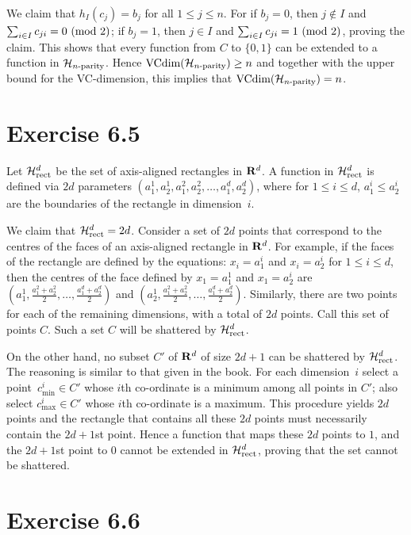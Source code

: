 We claim that $h_I(c_j) = b_j$ for all $1 \leq j \leq n$. For if $b_j = 0$, 
then $j \notin I$ and $\sum_{i \in I} c_{j i} = 0 \ (\mathrm{mod}\ 2)$; if $b_j = 1$,
then $j \in I$ and $\sum_{i \in I} c_{j i} = 1 \ (\mathrm{mod}\ 2)$, proving the claim. 
This shows that every function from $C$ to $\{0, 1\}$ can be extended to a function
in $\mathcal{H}_{n\text{-parity}}$. Hence $\text{VCdim} (\mathcal{H}_{n\text{-parity}}) \geq n$ and together with the upper 
bound for the VC-dimension, this implies that $\text{VCdim} (\mathcal{H}_{n\text{-parity}}) = n$.

\section*{Exercise 6.5}

Let $\mathcal{H}_{\text{rect}}^{d}$ be the set of axis-aligned rectangles in $\mathbf{R}^{d}$. A function
in $\mathcal{H}_{\text{rect}}^{d}$ is defined via $2d$ parameters $(a_1^1, a_2^1, a_1^2, a_2^2,
\ldots, a_1^d, a_2^d)$, where for $1 \leq i \leq d$, $a_1^i \leq a_2^i$ are the
boundaries of the rectangle in dimension~$i$. 

We claim that $\mathcal{H}_{\text{rect}}^{d} = 2d$. Consider a set of $2d$ points that correspond to 
the centres of the faces of an axis-aligned rectangle in $\mathbf{R}^d$. For example,
if the faces of the rectangle are defined by the equations:
$x_i  = a_1^i$ and  $x_i = a_2^i$ for $1 \leq i \leq d$,
then the centres of the face defined by $x_1 = a_1^1$ and $x_1 = a_2^i$ are 
$( a_1^1,  \frac{a_1^2 + a_2^2}{2},  \ldots, \frac{a_1^d + a_2^d}{2})$ 
and $( a_2^1,  \frac{a_1^2 + a_2^2}{2},  \ldots, \frac{a_1^d + a_2^d}{2})$. 
Similarly, there are two points for each of the remaining dimensions, with a 
total of $2d$ points. Call this set of points $C$. Such a set $C$ will be shattered
by $\mathcal{H}_{\text{rect}}^{d}$. 

On the other hand, no subset $C'$ of $\mathbf{R}^d$ of size $2d + 1$ can be
shattered by $\mathcal{H}_{\text{rect}}^{d}$. The reasoning is similar to that given in the book.
For each dimension~$i$ select a point~$c_{\text{min}}^i \in C'$ whose $i$th
co-ordinate is a minimum among all points in $C'$; also select
$c_{\text{max}}^i \in C'$ whose $i$th co-ordinate is a maximum. This procedure
yields $2d$ points and the rectangle that contains all these $2d$ points must
necessarily contain the $2d + 1$st point. Hence a function that maps these $2d$
points to $1$, and the $2d + 1$st point to $0$ cannot be extended in
$\mathcal{H}_{\text{rect}}^{d}$, proving that the set cannot be shattered. 

\section*{Exercise 6.6}

